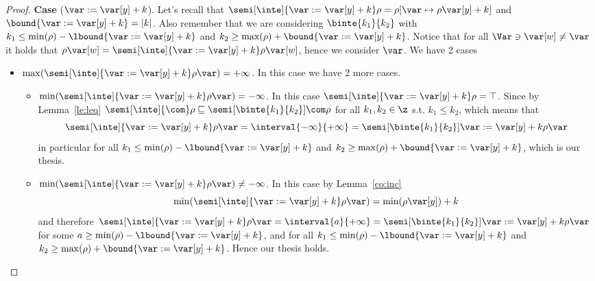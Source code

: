 \begin{proof}
  \noindent
  \textbf{Case} (\(\var := \var[y] + k\)).
  Let's recall that
  \({\semi[\inte]{\var := \var[y] + k}\rho = \rho[\var \mapsto
    \rho\var[y] + k]}\) and \(\bound{\var := \var[y] + k} =
  |k|\). Also remember that we are considering \(\binte{k_1}{k_2}\)
  with \(k_1 \leq \min(\rho) - \lbound{\var := \var[y] + k}\) and
  \(k_2 \geq \max(\rho) + \bound{\var := \var[y] + k}\). Notice that
  for all \(\Var \ni \var[w] \neq \var \) it holds that
  \(\rho\var[w] = \semi[\inte]{\var := \var[y] + k}\rho\var[w]\),
  hence we consider \(\var\). We have 2 cases
  \begin{itemize}
  \item
    \({\max(\semi[\inte]{\var := \var[y] + k}\rho\var)} =
    +\infty\). In this case we have 2 more cases.
    \begin{itemize}
    \item
      \({\min(\semi[\inte]{\var := \var[y] + k}\rho\var)} =
      -\infty\). In this case
      \({\semi[\inte]{\var := \var[y] + k}\rho} = \top\). Since by
      Lemma~\ref{le:leq}
      \(\semi[\inte]{\com}\rho \sqsubseteq
      \semi[\binte{k_1}{k_2}]{\com}\rho\) for all \(k_1, k_2 \in \z\)
      s.t. \(k_1 \leq k_2\), which means that
      \begin{equation*}
        \semi[\inte]{\var := \var[y] + k}\rho\var = \interval{-\infty}{+\infty} = \semi[\binte{k_1}{k_2}]{\var := \var[y] + k}\rho\var
      \end{equation*}
      in particular for all
      \(k_1 \leq \min(\rho) - \lbound{\var := \var[y] + k}\) and
      \(k_2 \geq \max(\rho) + \bound{\var := \var[y] + k}\), which is
      our thesis.
    \item
      \({\min(\semi[\inte]{\var := \var[y] + k}\rho\var)} \neq -
      \infty\). In this case by Lemma~\ref{co:inc}
      \begin{equation*}
        \min(\semi[\inte]{\var := \var[y] + k}\rho\var) = \min(\rho\var[y]) + k
      \end{equation*}
      and therefore
      \({\semi[\inte]{\var := \var[y] + k}\rho\var} =
      \interval{a}{+\infty} = {\semi[\binte{k_1}{k_2}]{\var := \var[y]
          + k}\rho\var}\) for some
      \(a \geq \min(\rho) - \lbound{\var := \var[y] + k}\), and for
      all \(k_1 \leq \min(\rho)- \lbound{\var := \var[y] + k}\) and
      \(k_2 \geq \max(\rho) + \bound{\var := \var[y] + k}\). Hence our
      thesis holds.


\end{itemize}
\end{itemize}
\end{proof}
